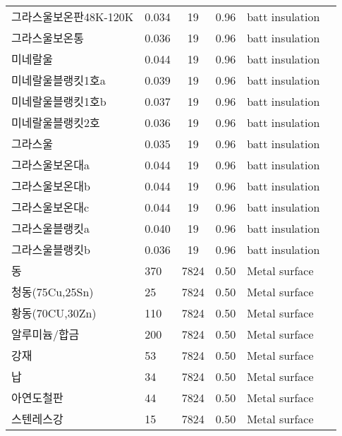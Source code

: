 \begin{longtable}{llcclc}
  그라스울보온판48K-120K &   0.034 &   19 & 0.96 & batt insulation & \cite{ashrae_f18} \\
  그라스울보온통 &   0.036 &   19 & 0.96 & batt insulation & \cite{ashrae_f18} \\
  미네랄울 &   0.044 &   19 & 0.96 & batt insulation & \cite{ashrae_f18} \\
  미네랄울블랭킷1호a &   0.039 &   19 & 0.96 & batt insulation & \cite{ashrae_f18} \\
  미네랄울블랭킷1호b &   0.037 &   19 & 0.96 & batt insulation & \cite{ashrae_f18} \\
  미네랄울블랭킷2호 &   0.036 &   19 & 0.96 & batt insulation & \cite{ashrae_f18} \\
  그라스울 &   0.035 &   19 & 0.96 & batt insulation & \cite{ashrae_f18} \\
  그라스울보온대a &   0.044 &   19 & 0.96 & batt insulation & \cite{ashrae_f18} \\
  그라스울보온대b &   0.044 &   19 & 0.96 & batt insulation & \cite{ashrae_f18} \\
  그라스울보온대c &   0.044 &   19 & 0.96 & batt insulation & \cite{ashrae_f18} \\
  그라스울블랭킷a &   0.040 &   19 & 0.96 & batt insulation & \cite{ashrae_f18} \\
  그라스울블랭킷b &   0.036 &   19 & 0.96 & batt insulation & \cite{ashrae_f18} \\
  동 & 370 & 7824 & 0.50 & Metal surface & \cite{ashrae_f18} \\
  청동(75Cu,25Sn) &  25 & 7824 & 0.50 & Metal surface & \cite{ashrae_f18} \\
  황동(70CU,30Zn) & 110 & 7824 & 0.50 & Metal surface & \cite{ashrae_f18} \\
  알루미늄/합금 & 200 & 7824 & 0.50 & Metal surface & \cite{ashrae_f18} \\
  강재 &  53 & 7824 & 0.50 & Metal surface & \cite{ashrae_f18} \\
  납 &  34 & 7824 & 0.50 & Metal surface & \cite{ashrae_f18} \\
  아연도철판 &  44 & 7824 & 0.50 & Metal surface & \cite{ashrae_f18} \\
  스텐레스강 &  15 & 7824 & 0.50 & Metal surface & \cite{ashrae_f18} \\
  \bottomrule
\end{longtable}

